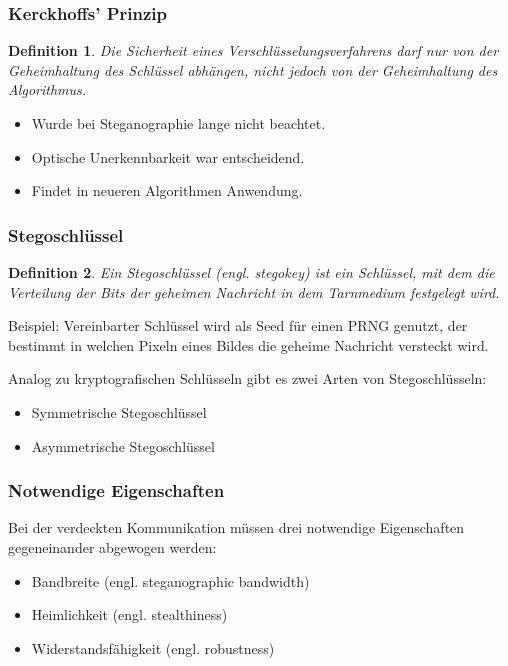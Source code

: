 \documentclass{beamer}
\newtheorem{mydef}{Definition}
\begin{document}
\begin{frame}
    \frametitle{Kerckhoffs' Prinzip}
    \begin{mydef}
      Die Sicherheit eines Verschlüsselungsverfahrens darf nur von der Geheimhaltung des Schlüssel abhängen, nicht jedoch von der Geheimhaltung des Algorithmus.
  \end{mydef}
    \begin{itemize}
      \item Wurde bei Steganographie lange nicht beachtet.
      \item Optische Unerkennbarkeit war entscheidend.
      \item Findet in neueren Algorithmen Anwendung.
    \end{itemize}
\end{frame}

\begin{frame}
    \frametitle{Stegoschlüssel}
    \begin{mydef}
    Ein Stegoschlüssel (engl. stegokey) ist ein Schlüssel, mit dem die Verteilung der Bits der geheimen Nachricht in dem Tarnmedium festgelegt wird.
  \end{mydef}
  Beispiel: Vereinbarter Schlüssel wird als Seed für einen PRNG genutzt, der bestimmt in welchen Pixeln eines Bildes die geheime Nachricht versteckt wird.
\end{frame}

\begin{frame}
  Analog zu kryptografischen Schlüsseln gibt es zwei Arten von Stegoschlüsseln:
  \begin{itemize}
	    \item Symmetrische Stegoschlüssel
	    \item Asymmetrische Stegoschlüssel	    
	  \end{itemize}
\end{frame}

\begin{frame}
\frametitle{Notwendige Eigenschaften}
  Bei der verdeckten Kommunikation müssen drei notwendige Eigenschaften gegeneinander abgewogen werden:
  \begin{itemize}
    \item Bandbreite (engl. steganographic bandwidth)
    \item Heimlichkeit (engl. stealthiness)
    \item Widerstandsfähigkeit (engl. robustness)
  \end{itemize}
  
\end{frame}
\end{document}
